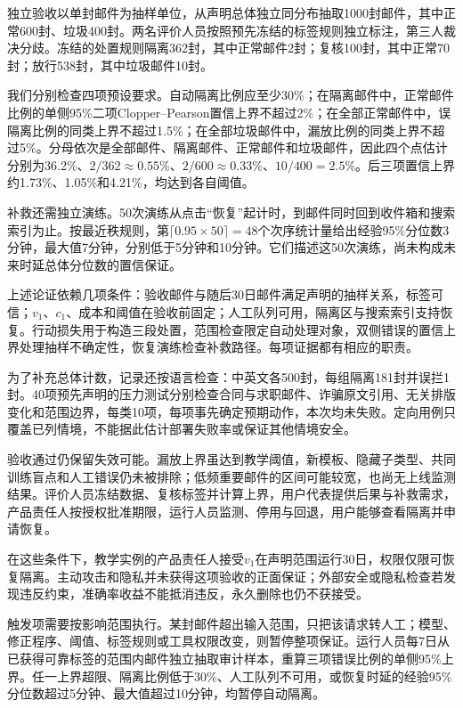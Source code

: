 独立验收以单封邮件为抽样单位，从声明总体独立同分布抽取1000封邮件，其中正常600封、垃圾400封。两名评价人员按照预先冻结的标签规则独立标注，第三人裁决分歧。冻结的处置规则隔离362封，其中正常邮件2封；复核100封，其中正常70封；放行538封，其中垃圾邮件10封。

我们分别检查四项预设要求。自动隔离比例应至少30\%；在隔离邮件中，正常邮件比例的单侧95\%二项Clopper--Pearson置信上界不超过2\%；在全部正常邮件中，误隔离比例的同类上界不超过1.5\%；在全部垃圾邮件中，漏放比例的同类上界不超过5\%。分母依次是全部邮件、隔离邮件、正常邮件和垃圾邮件，因此四个点估计分别为36.2\%、$2/362\approx0.55\%$、$2/600\approx0.33\%$、$10/400=2.5\%$。后三项置信上界约1.73\%、1.05\%和4.21\%，均达到各自阈值。

补救还需独立演练。50次演练从点击“恢复”起计时，到邮件同时回到收件箱和搜索索引为止。按最近秩规则，第$\lceil0.95\times50\rceil=48$个次序统计量给出经验95\%分位数3分钟，最大值7分钟，分别低于5分钟和10分钟。它们描述这50次演练，尚未构成未来时延总体分位数的置信保证。

上述论证依赖几项条件：验收邮件与随后30日邮件满足声明的抽样关系，标签可信；$v_1$、$c_1$、成本和阈值在验收前固定；人工队列可用，隔离区与搜索索引支持恢复。行动损失用于构造三段处置，范围检查限定自动处理对象，双侧错误的置信上界处理抽样不确定性，恢复演练检查补救路径。每项证据都有相应的职责。

为了补充总体计数，记录还按语言检查：中英文各500封，每组隔离181封并误拦1封。40项预先声明的压力测试分别检查合同与求职邮件、诈骗原文引用、无关排版变化和范围边界，每类10项，每项事先确定预期动作，本次均未失败。定向用例只覆盖已列情境，不能据此估计部署失败率或保证其他情境安全。

验收通过仍保留失效可能。漏放上界虽达到教学阈值，新模板、隐藏子类型、共同训练盲点和人工错误仍未被排除；低频重要邮件的区间可能较宽，也尚无上线监测结果。评价人员冻结数据、复核标签并计算上界，用户代表提供后果与补救需求，产品责任人按授权批准期限，运行人员监测、停用与回退，用户能够查看隔离并申请恢复。

在这些条件下，教学实例的产品责任人接受$v_1$在声明范围运行30日，权限仅限可恢复隔离。主动攻击和隐私并未获得这项验收的正面保证；外部安全或隐私检查若发现违反约束，准确率收益不能抵消违反，永久删除也仍不获接受。

触发项需要按影响范围执行。某封邮件超出输入范围，只把该请求转人工；模型、修正程序、阈值、标签规则或工具权限改变，则暂停整项保证。运行人员每7日从已获得可靠标签的范围内邮件独立抽取审计样本，重算三项错误比例的单侧95\%上界。任一上界超限、隔离比例低于30\%、人工队列不可用，或恢复时延的经验95\%分位数超过5分钟、最大值超过10分钟，均暂停自动隔离。

